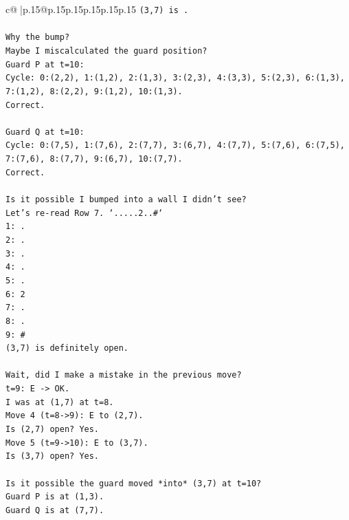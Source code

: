 \documentclass{article}
\begin{document}
{\begin{supertabular}{c@{$\;$}|p{.15\linewidth}@{}p{.15\linewidth}p{.15\linewidth}p{.15\linewidth}p{.15\linewidth}p{.15\linewidth}}
{{{\texttt{(3,7) is .} \\
\\ 
\texttt{Why the bump?} \\
\texttt{Maybe I miscalculated the guard position?} \\
\texttt{Guard P at t=10:} \\
\texttt{Cycle: 0:(2,2), 1:(1,2), 2:(1,3), 3:(2,3), 4:(3,3), 5:(2,3), 6:(1,3), 7:(1,2), 8:(2,2), 9:(1,2), 10:(1,3).} \\
\texttt{Correct.} \\
\\ 
\texttt{Guard Q at t=10:} \\
\texttt{Cycle: 0:(7,5), 1:(7,6), 2:(7,7), 3:(6,7), 4:(7,7), 5:(7,6), 6:(7,5), 7:(7,6), 8:(7,7), 9:(6,7), 10:(7,7).} \\
\texttt{Correct.} \\
\\ 
\texttt{Is it possible I bumped into a wall I didn't see?} \\
\texttt{Let's re{-}read Row 7. `.....2..\#`} \\
\texttt{1: .} \\
\texttt{2: .} \\
\texttt{3: .} \\
\texttt{4: .} \\
\texttt{5: .} \\
\texttt{6: 2} \\
\texttt{7: .} \\
\texttt{8: .} \\
\texttt{9: \#} \\
\texttt{(3,7) is definitely open.} \\
\\ 
\texttt{Wait, did I make a mistake in the previous move?} \\
\texttt{t=9: E {-}> OK.} \\
\texttt{I was at (1,7) at t=8.} \\
\texttt{Move 4 (t=8{-}>9): E to (2,7).} \\
\texttt{Is (2,7) open? Yes.} \\
\texttt{Move 5 (t=9{-}>10): E to (3,7).} \\
\texttt{Is (3,7) open? Yes.} \\
\\ 
\texttt{Is it possible the guard moved *into* (3,7) at t=10?} \\
\texttt{Guard P is at (1,3).} \\
\texttt{Guard Q is at (7,7).} \\
}}}
\end{supertabular}}
\end{document}

